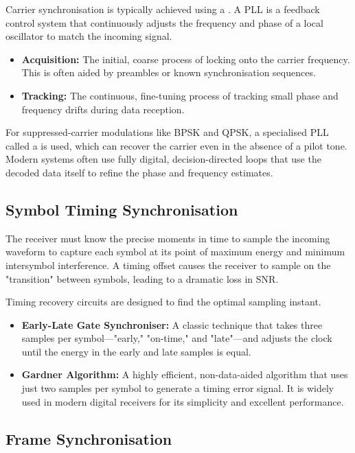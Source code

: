 Carrier synchronisation is typically achieved using a . A PLL is a feedback control system that continuously adjusts the frequency and phase of a local oscillator to match the incoming signal.
\begin{itemize}
    \item \textbf{Acquisition:} The initial, coarse process of locking onto the carrier frequency. This is often aided by preambles or known synchronisation sequences.
    \item \textbf{Tracking:} The continuous, fine-tuning process of tracking small phase and frequency drifts during data reception.
\end{itemize}
For suppressed-carrier modulations like BPSK and QPSK, a specialised PLL called a  is used, which can recover the carrier even in the absence of a pilot tone. Modern systems often use fully digital, decision-directed loops that use the decoded data itself to refine the phase and frequency estimates.


\subsection{Symbol Timing Synchronisation}

The receiver must know the precise moments in time to sample the incoming waveform to capture each symbol at its point of maximum energy and minimum intersymbol interference. A timing offset causes the receiver to sample on the "transition" between symbols, leading to a dramatic loss in SNR.

Timing recovery circuits are designed to find the optimal sampling instant.
\begin{itemize}
    \item \textbf{Early-Late Gate Synchroniser:} A classic technique that takes three samples per symbol—"early," "on-time," and "late"—and adjusts the clock until the energy in the early and late samples is equal.
    \item \textbf{Gardner Algorithm:} A highly efficient, non-data-aided algorithm that uses just two samples per symbol to generate a timing error signal. It is widely used in modern digital receivers for its simplicity and excellent performance.
\end{itemize}


\subsection{Frame Synchronisation}

